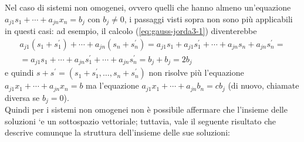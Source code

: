 \documentclass{book}
\theoremstyle{definition}
\theoremstyle{plain}
\begin{document}
Nel caso di sistemi non omogenei, ovvero quelli che hanno almeno
un'equazione $a_{j1}s_1+\cdots+a_{jn}x_n=b_j$ con $b_j\neq 0$, i passaggi
visti sopra non sono più applicabili in questi casi: ad esempio, il
calcolo (\ref{eq:gauss-jorda3-1}) diventerebbe
\begin{equation*}
  \begin{matrix}
    a_{j1}(s_1+s_1^\prime)+\cdots+a_{jn}(s_n+s_n^\prime)=a_{j1}s_1+a_{j1}
    s_1^\prime+\cdots+a_{jn}s_n+a_{jn}s_n^\prime=\\
    =a_{j1}s_1+\cdots+a_{jn}s_1^\prime+\cdots+a_{jn}s_n^\prime=b_j+b_j=2b_j
  \end{matrix}
\end{equation*}
e quindi $s+s^\prime=(s_1+s_1^\prime,\dots, s_n+s_n^\prime)$ non risolve più
l'equazione $a_{j1}x_1+\cdots+a_{jn}x_n=b$ ma l'equazione $a_{j1}x_1+\cdots
+a_{jn}b_n=cb_j$ (di nuovo, chiamate diversa se $b_j=0$).\\
Quindi per i sistemi non omogenei non è possibile affermare che l'insieme
delle soluzioni `e un sottospazio vettoriale; tuttavia, vale il seguente
risultato che descrive comunque la struttura dell'insieme delle sue
soluzioni:
\end{document}
